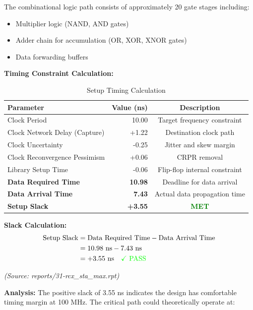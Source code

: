 \documentclass[12pt,a4paper]{article}
\begin{document}
The combinational logic path consists of approximately 20 gate stages including:
\begin{itemize}
    \item Multiplier logic (NAND, AND gates)
    \item Adder chain for accumulation (OR, XOR, XNOR gates)
    \item Data forwarding buffers
\end{itemize}

\textbf{Timing Constraint Calculation:}

\begin{table}[H]
\centering
\caption{Setup Timing Calculation}
\label{tab:setup_calc}
\begin{tabular}{@{}lrc@{}}
\toprule
\textbf{Parameter} & \textbf{Value (ns)} & \textbf{Description} \\
\midrule
Clock Period & 10.00 & Target frequency constraint \\
Clock Network Delay (Capture) & +1.22 & Destination clock path \\
Clock Uncertainty & -0.25 & Jitter and skew margin \\
Clock Reconvergence Pessimism & +0.06 & CRPR removal \\
Library Setup Time & -0.06 & Flip-flop internal constraint \\
\midrule
\textbf{Data Required Time} & \textbf{10.98} & Deadline for data arrival \\
\textbf{Data Arrival Time} & \textbf{7.43} & Actual data propagation time \\
\midrule
\textbf{Setup Slack} & \textbf{+3.55} & \textcolor{green}{\textbf{MET}} \\
\bottomrule
\end{tabular}
\end{table}

\textbf{Slack Calculation:}
\begin{align}
    \text{Setup Slack} &= \text{Data Required Time} - \text{Data Arrival Time} \nonumber \\
    &= 10.98 \text{ ns} - 7.43 \text{ ns} \nonumber \\
    &= +3.55 \text{ ns} \quad \textcolor{green}{\checkmark \text{ PASS}}
\end{align}

\textit{(Source: reports/31-rcx\_sta\_max.rpt)}

\textbf{Analysis:}
The positive slack of 3.55 ns indicates the design has comfortable timing margin at 100 MHz. The critical path could theoretically operate at:
\end{document}
